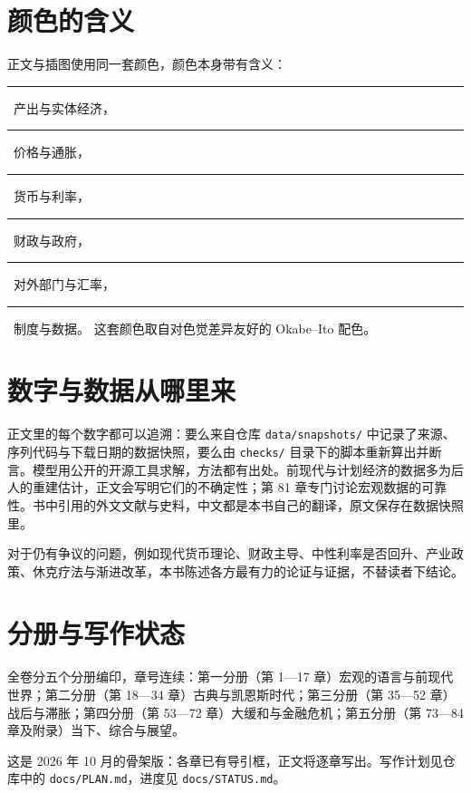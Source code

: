\section*{颜色的含义}\label{front:colours}

正文与插图使用同一套颜色，颜色本身带有含义：
\textcolor{outp}{\rule{0.9em}{0.9em}}~产出与实体经济，
\textcolor{pric}{\rule{0.9em}{0.9em}}~价格与通胀，
\textcolor{mone}{\rule{0.9em}{0.9em}}~货币与利率，
\textcolor{fisc}{\rule{0.9em}{0.9em}}~财政与政府，
\textcolor{extn}{\rule{0.9em}{0.9em}}~对外部门与汇率，
\textcolor{inst}{\rule{0.9em}{0.9em}}~制度与数据。
这套颜色取自对色觉差异友好的 Okabe–Ito 配色。

\section*{数字与数据从哪里来}\label{front:traceability}

正文里的每个数字都可以追溯：要么来自仓库 \texttt{data/snapshots/} 中记录了来源、序列代码与下载日期的数据快照，要么由 \texttt{checks/} 目录下的脚本重新算出并断言。模型用公开的开源工具求解，方法都有出处。前现代与计划经济的数据多为后人的重建估计，正文会写明它们的不确定性；第 81 章专门讨论宏观数据的可靠性。书中引用的外文文献与史料，中文都是本书自己的翻译，原文保存在数据快照里。

对于仍有争议的问题，例如现代货币理论、财政主导、中性利率是否回升、产业政策、休克疗法与渐进改革，本书陈述各方最有力的论证与证据，不替读者下结论。

\section*{分册与写作状态}\label{front:books}

全卷分五个分册编印，章号连续：第一分册（第 1—17 章）宏观的语言与前现代世界；第二分册（第 18—34 章）古典与凯恩斯时代；第三分册（第 35—52 章）战后与滞胀；第四分册（第 53—72 章）大缓和与金融危机；第五分册（第 73—84 章及附录）当下、综合与展望。

这是 2026 年 10 月的骨架版：各章已有导引框，正文将逐章写出。写作计划见仓库中的 \texttt{docs/PLAN.md}，进度见 \texttt{docs/STATUS.md}。
